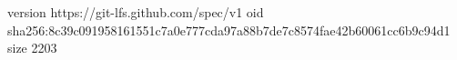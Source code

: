 version https://git-lfs.github.com/spec/v1
oid sha256:8c39c091958161551c7a0e777cda97a88b7de7c8574fae42b60061cc6b9c94d1
size 2203
